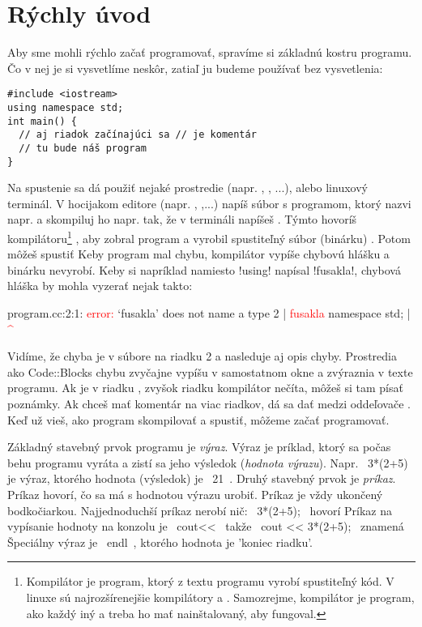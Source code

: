 \chapter{Rýchly úvod}
Aby sme mohli rýchlo začať programovať,
spravíme si základnú kostru programu. Čo v nej je si vysvetlíme neskôr, zatiaľ
ju budeme používať bez vysvetlenia:

\begin{lstlisting}
#include <iostream>
using namespace std;
int main() {
  // aj riadok začínajúci sa // je komentár
  // tu bude náš program
}
\end{lstlisting}


Na spustenie sa dá použiť nejaké prostredie (napr.
, , ...), alebo linuxový terminál.  V
hocijakom editore (napr. %
,
,...) napíš súbor s
programom, ktorý nazvi napr.  a skompiluj ho napr. tak, že
v termináli napíšeš . Týmto hovoríš
kompilátoru\footnote{%
  Kompilátor je program, ktorý z textu programu vyrobí
  spustiteľný kód. V linuxe sú najrozšírenejšie kompilátory  a
  . Samozrejme, kompilátor je program, ako každý iný a treba ho mať
  nainštalovaný, aby fungoval.  } 
, aby zobral program 
a vyrobil spustiteľný súbor (binárku) . Potom môžeš spustiť
 Keby program mal chybu, kompilátor vypíše chybovú hlášku a
binárku nevyrobí.  Keby si napríklad namiesto \prg!using! napísal
\prg!fusakla!, chybová hláška by mohla vyzerať nejak takto:

\begin{outputBox}
program.cc:2:1: \textcolor{red}{error:} ‘fusakla’ does not name a type
    2 | \textcolor{red}{fusakla} namespace std;
      | \textcolor{red}{^~~~~~}
\end{outputBox}

Vidíme, že chyba je v súbore  na riadku 2 a nasleduje aj opis chyby.
Prostredia ako Code::Blocks chybu zvyčajne vypíšu v samostatnom okne a zvýraznia v texte
programu. Ak je v riadku \vb{//}, zvyšok riadku kompilátor nečíta, môžeš si tam písať poznámky. Ak chceš mať komentár na viac riadkov, dá sa dať medzi 
oddeľovače .
Keď už vieš, ako program skompilovať a spustiť, môžeme začať programovať.

Základný stavebný prvok programu je {\em výraz}. Výraz je príklad, ktorý
sa počas behu programu vyráta a zistí sa jeho výsledok ({\em hodnota výrazu}). 
Napr. \prg~3*(2+5)~ je
výraz, ktorého hodnota (výsledok) je \prg~21~.  Druhý stavebný prvok je {\em príkaz}.
Príkaz hovorí, čo sa má s hodnotou výrazu urobiť. 
Príkaz je vždy ukončený bodkočiarkou.  Najjednoduchší
príkaz nerobí nič: \prg~3*(2+5);~ hovorí  Príkaz na vypísanie hodnoty na konzolu je \prg~cout<<~ takže
\prg~cout << 3*(2+5);~ znamená  Špeciálny výraz je \prg ~endl~, ktorého hodnota je 'koniec riadku'.

